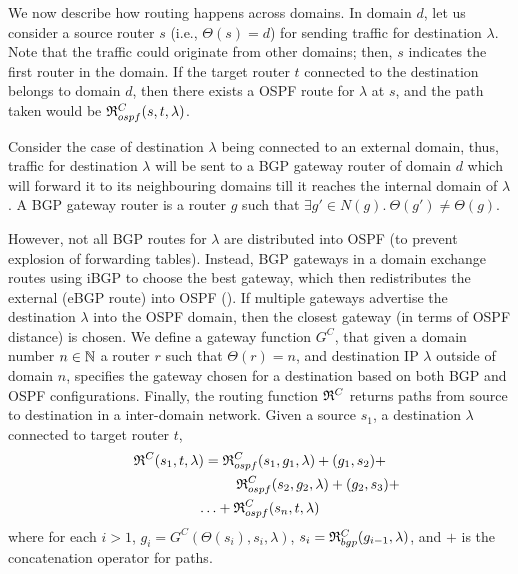  We now describe how routing
happens across domains.  In domain $d$, let us consider a source
router $s$ (i.e., $\Theta(s) = d$) for sending traffic for destination
$\lambda$. Note that the traffic could originate from other domains;
then, $s$ indicates the first router in the domain. If the target router $t$ connected to the
destination belongs to domain $d$, then there exists a OSPF route for
$\lambda$ at $s$, and the path taken would be
$\mathfrak{R}_{ospf}^C(s,t,\lambda)$.

Consider the case of destination $\lambda$ being connected 
to an external domain, thus, traffic for destination $\lambda$
will be sent to a BGP gateway router of domain $d$ which 
will forward it to its neighbouring domains till
it reaches the internal domain of $\lambda$. A BGP gateway
router is a router $g$ such that $\exists g' \in N(g). 
~\Theta(g') \not= \Theta(g)$. 

However, not all BGP routes for $\lambda$
are distributed 
into OSPF (to prevent explosion of forwarding tables). Instead,
BGP gateways in a domain exchange routes using iBGP to choose
the best gateway, which then redistributes the external
(eBGP route) into OSPF (). If multiple
gateways advertise the destination $\lambda$ into the OSPF 
domain, then the closest gateway (in terms of OSPF distance)
is chosen. We define a gateway function $G^C$,
that given a domain number $n\in \mathbb{N}$
a router $r$ such that $\Theta(r)=n$,
and destination IP $\lambda$ outside of domain $n$, specifies the
gateway chosen for a destination based on both BGP and OSPF
configurations. 
Finally, the routing function 
$\mathfrak{R}^C$
returns paths from source to destination in a inter-domain network. 
Given a source $s_1$, a destination $\lambda$ connected to target router $t$, 
\begin{multline}
	\mathfrak{R}^C(s_1, t, \lambda) = 
	\mathfrak{R}_{ospf}^C(s_1,g_1, \lambda) + 
	 (g_1, s_2 )+ \\
	~~~~~~~~~~~~~~~~~~~~~~~~~\mathfrak{R}_{ospf}^C(s_2,g_2, \lambda) + (g_2, s_3) + \\
	\ldots  +\mathfrak{R}_{ospf}^C(s_n,t,\lambda)
\end{multline}
where for each $i>1$, $g_i=G^C(\Theta(s_i),s_i,\lambda)$, 
$s_i=\mathfrak{R}_{bgp}^C(g_{i-1}, \lambda)$,
and  $+$ is the concatenation operator for paths. 



